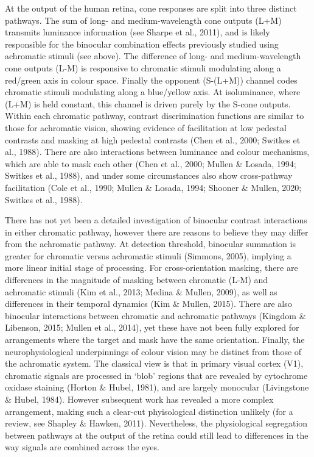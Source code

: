 \documentclass[
  letterpaper,
  DIV=11,
  numbers=noendperiod]{scrartcl}
\begin{document}
At the output of the human retina, cone responses are split into three
distinct pathways. The sum of long- and medium-wavelength cone outputs
(L+M) transmits luminance information (see Sharpe et al., 2011), and is
likely responsible for the binocular combination effects previously
studied using achromatic stimuli (see above). The difference of long-
and medium-wavelength cone outputs (L-M) is responsive to chromatic
stimuli modulating along a red/green axis in colour space. Finally the
opponent (S-(L+M)) channel codes chromatic stimuli modulating along a
blue/yellow axis. At isoluminance, where (L+M) is held constant, this
channel is driven purely by the S-cone outputs. Within each chromatic
pathway, contrast discrimination functions are similar to those for
achromatic vision, showing evidence of facilitation at low pedestal
contrasts and masking at high pedestal contrasts (Chen et al., 2000;
Switkes et al., 1988). There are also interactions between luminance and
colour mechanisms, which are able to mask each other (Chen et al., 2000;
Mullen \& Losada, 1994; Switkes et al., 1988), and under some
circumstances also show cross-pathway facilitation (Cole et al., 1990;
Mullen \& Losada, 1994; Shooner \& Mullen, 2020; Switkes et al., 1988).

There has not yet been a detailed investigation of binocular contrast
interactions in either chromatic pathway, however there are reasons to
believe they may differ from the achromatic pathway. At detection
threshold, binocular summation is greater for chromatic versus
achromatic stimuli (Simmons, 2005), implying a more linear initial stage
of processing. For cross-orientation masking, there are differences in
the magnitude of masking between chromatic (L-M) and achromatic stimuli
(Kim et al., 2013; Medina \& Mullen, 2009), as well as differences in
their temporal dynamics (Kim \& Mullen, 2015). There are also binocular
interactions between chromatic and achromatic pathways (Kingdom \&
Libenson, 2015; Mullen et al., 2014), yet these have not been fully
explored for arrangements where the target and mask have the same
orientation. Finally, the neurophysiological underpinnings of colour
vision may be distinct from those of the achromatic system. The
classical view is that in primary visual cortex (V1), chromatic signals
are processed in `blob' regions that are revealed by cytochrome oxidase
staining (Horton \& Hubel, 1981), and are largely monocular (Livingstone
\& Hubel, 1984). However subsequent work has revealed a more complex
arrangement, making such a clear-cut phyisological distinction unlikely
(for a review, see Shapley \& Hawken, 2011). Nevertheless, the
physiological segregation between pathways at the output of the retina
could still lead to differences in the way signals are combined across
the eyes.
\end{document}

